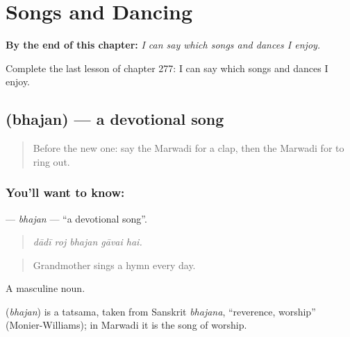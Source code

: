 
\chapter{Songs and Dancing}
\label{ch:mw-songs-and-dancing}

\begin{chapteropening}
\textbf{By the end of this chapter:} \emph{I can say which songs and dances I enjoy.}

Complete the last lesson of chapter 277: I can say which songs and dances I enjoy.
\end{chapteropening}

\section[\texorpdfstring{\mw{भजन} (bhajan)}{भजन (bhajan)}]{ (bhajan) — a devotional song}

\label{lesson:MW-C277-bhajan}



\begin{quote}
Before the new one: say the Marwadi for a clap, then the Marwadi for to ring out.
\end{quote}

\subsection*{You'll want to know: }
\textbf{} — \emph{bhajan} — \textquotedblleft{}a devotional song\textquotedblright{}.

\begin{quote}
    
\end{quote}

\begin{quote}
\emph{dādī roj bhajan gāvai hai.}
\end{quote}

\begin{quote}
Grandmother sings a hymn every day.
\end{quote}

A masculine noun.

\begin{cousinweb}
\textbf{} (\emph{bhajan}) is a tatsama, taken from Sanskrit \emph{bhajana}, \textquotedblleft{}reverence, worship\textquotedblright{} (Monier-Williams); in Marwadi it is the song of worship.
\end{cousinweb}

